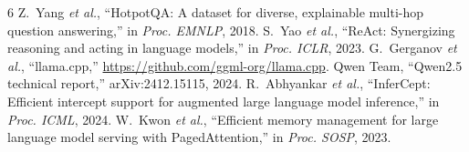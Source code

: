 \documentclass[conference]{IEEEtran}
\begin{document}
\begin{thebibliography}{6}
\footnotesize
{} Z.~Yang \emph{et al.}, ``HotpotQA: A dataset for diverse, explainable multi-hop question
answering,'' in \emph{Proc. EMNLP}, 2018.
 S.~Yao \emph{et al.}, ``ReAct: Synergizing reasoning and acting in language models,'' in
\emph{Proc. ICLR}, 2023.
 G.~Gerganov \emph{et al.}, ``llama.cpp,'' \url{https://github.com/ggml-org/llama.cpp}.
 Qwen Team, ``Qwen2.5 technical report,'' arXiv:2412.15115, 2024.
 R.~Abhyankar \emph{et al.}, ``InferCept: Efficient intercept support for augmented
large language model inference,'' in \emph{Proc. ICML}, 2024.
 W.~Kwon \emph{et al.}, ``Efficient memory management for large language model serving
with PagedAttention,'' in \emph{Proc. SOSP}, 2023.
\end{thebibliography}
\end{document}

